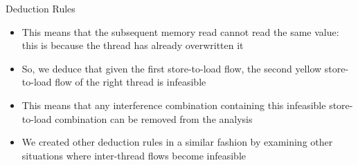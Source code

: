 \documentclass[t]{beamer}
\begin{document}
\begin{frame}{Deduction Rules}
{\begin{itemize}
      \item This means that the subsequent memory read cannot read the same
        value: this is because the thread has already overwritten it
      \item So, we deduce that given the first store-to-load flow, the second
        yellow store-to-load flow of the right thread is infeasible
      \item This means that any interference combination containing this
        infeasible store-to-load combination can be removed from the analysis
      \item We created other deduction rules in a similar fashion by examining
        other situations where inter-thread flows become infeasible
    \end{itemize}
  }
\end{frame}
\end{document}
